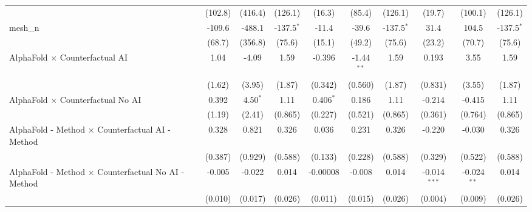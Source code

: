 \begin{tabular}{lccccccccc}
                                                               & (102.8)         & (416.4)         & (126.1)        & (16.3)        & (85.4)        & (126.1)        & (19.7)         & (100.1)       & (126.1)\\   
   mesh\_n                                                     & -109.6          & -488.1          & -137.5$^{*}$   & -11.4         & -39.6         & -137.5$^{*}$   & 31.4           & 104.5         & -137.5$^{*}$\\   
                                                               & (68.7)          & (356.8)         & (75.6)         & (15.1)        & (49.2)        & (75.6)         & (23.2)         & (70.7)        & (75.6)\\   
   AlphaFold $\times$ Counterfactual AI                        & 1.04            & -4.09           & 1.59           & -0.396        & -1.44$^{**}$  & 1.59           & 0.193          & 3.55          & 1.59\\   
                                                               & (1.62)          & (3.95)          & (1.87)         & (0.342)       & (0.560)       & (1.87)         & (0.831)        & (3.55)        & (1.87)\\   
   AlphaFold $\times$ Counterfactual No AI                     & 0.392           & 4.50$^{*}$      & 1.11           & 0.406$^{*}$   & 0.186         & 1.11           & -0.214         & -0.415        & 1.11\\   
                                                               & (1.19)          & (2.41)          & (0.865)        & (0.227)       & (0.521)       & (0.865)        & (0.361)        & (0.764)       & (0.865)\\   
   AlphaFold - Method $\times$ Counterfactual AI - Method      & 0.328           & 0.821           & 0.326          & 0.036         & 0.231         & 0.326          & -0.220         & -0.030        & 0.326\\   
                                                               & (0.387)         & (0.929)         & (0.588)        & (0.133)       & (0.228)       & (0.588)        & (0.329)        & (0.522)       & (0.588)\\   
   AlphaFold - Method $\times$ Counterfactual No AI - Method   & -0.005          & -0.022          & 0.014          & -0.00008      & -0.008        & 0.014          & -0.014$^{***}$ & -0.024$^{**}$ & 0.014\\   
                                                               & (0.010)         & (0.017)         & (0.026)        & (0.011)       & (0.015)       & (0.026)        & (0.004)        & (0.009)       & (0.026)\\   

\end{tabular}
